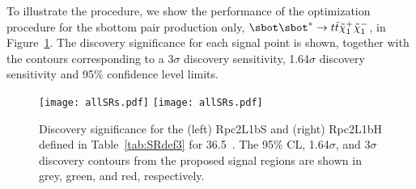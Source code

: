To illustrate the procedure, we show the performance of the optimization procedure for the sbottom pair production only, 
$\sbot\sbot^*\to t\bar t\tilde\chi_1^+\tilde\chi_1^-$, in Figure~\ref{fig:SR_withB}.
The discovery significance for each signal point is shown, together with the contours corresponding to a 
3$\sigma$ discovery sensitivity, 1.64$\sigma$ discovery sensitivity and 95\% confidence level limits. 
\begin{figure}[htb!]  
\centering
{\texttt{[image: allSRs.pdf]} }
{\texttt{[image: allSRs.pdf]} }
\vspace{-1cm}
\caption{Discovery significance for the (left) Rpc2L1bS and (right) Rpc2L1bH defined in 
Table~\ref{tab:SRdef3} for 36.5~\ifb.
The 95\% CL, 
1.64$\sigma$, and 3$\sigma$ discovery contours from the proposed signal 
regions are shown in grey, green, and red, respectively. 
 }
 \label{fig:SR_withB}
 \end{figure}






